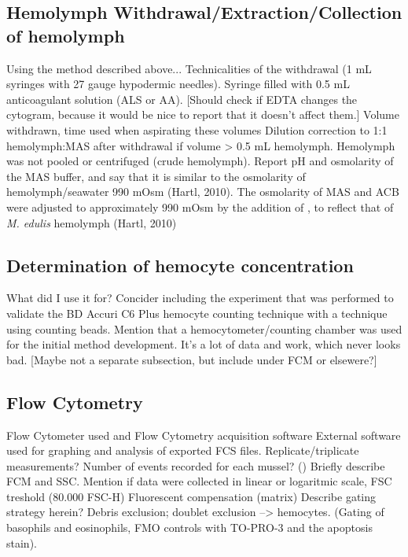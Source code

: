 \subsection{Hemolymph Withdrawal/Extraction/Collection of hemolymph}
Using the method described above...
Technicalities of the withdrawal (1 mL syringes with 27 gauge hypodermic needles).
Syringe filled with 0.5 mL anticoagulant solution (ALS or AA).
[Should check if EDTA changes the cytogram, because it would be nice to report that it doesn't affect them.] 
Volume withdrawn, time used when aspirating these volumes
Dilution correction to 1:1 hemolymph:MAS after withdrawal if volume > 0.5 mL hemolymph. 
Hemolymph was not pooled or centrifuged (crude hemolymph). Report pH and osmolarity of the MAS buffer, and say that it is similar to the osmolarity of hemolymph/seawater 990 mOsm (Hartl, 2010). The osmolarity of MAS and ACB were adjusted to approximately 990 mOsm by the addition of , to reflect that of \emph{M. edulis} hemolymph (Hartl, 2010)

\subsection{Determination of hemocyte concentration}
What did I use it for?
Concider including the experiment that was performed to validate the BD Accuri C6 Plus hemocyte counting technique with a technique using counting beads. Mention that a hemocytometer/counting chamber was used for the initial method development. It's a lot of data and work, which never looks bad. [Maybe not a separate subsection, but include under FCM or elsewere?]

\subsection{Flow Cytometry}
Flow Cytometer used and Flow Cytometry acquisition software
External software used for graphing and analysis of exported FCS files.
Replicate/triplicate measurements?
Number of events recorded for each mussel? ()
Briefly describe FCM and SSC.
Mention if data were collected in linear or logaritmic scale, 
FSC treshold (80.000 FSC-H)
Fluorescent compensation (matrix)
Describe gating strategy herein? Debris exclusion; doublet exclusion --> hemocytes. (Gating of basophils and eosinophils, FMO controls with TO-PRO-3 and the apoptosis stain).


